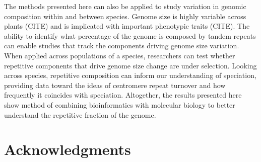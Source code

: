 \documentclass[10pt,letterpaper]{article}
\begin{document}
The methods presented here can also be applied to study variation in genomic composition within and between species.
Genome size is highly variable across plants (CITE) and is implicated with important phenotypic traits (CITE).
The ability to identify what percentage of the genome is composed by tandem repeats can enable studies that track the components driving genome size variation.
When applied across populations of a species, researchers can test whether repetitive components that drive genome size change are under selection.
Looking across species, repetitive composition can inform our understanding of speciation, providing data toward the ideas of centromere repeat turnover and how frequently it coincides with speciation.
Altogether, the results presented here show method of combining bioinformatics with molecular biology to better understand the repetitive fraction of the genome.



%
%

\section*{Acknowledgments}
\nolinenumbers

%
%
% 

\end{document}
